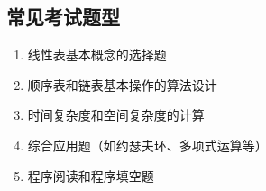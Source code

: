 \documentclass[12pt,a4paper]{amsart}
\begin{document}
\subsection{常见考试题型}

\begin{enumerate}
\item 线性表基本概念的选择题
\item 顺序表和链表基本操作的算法设计
\item 时间复杂度和空间复杂度的计算
\item 综合应用题（如约瑟夫环、多项式运算等）
\item 程序阅读和程序填空题
\end{enumerate}
\end{document}
